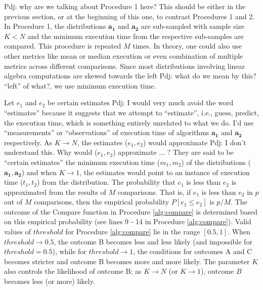 \documentclass[conference]{IEEEtran}
\newcommand{\p}[1]{{\color{blue} Pdj: #1}}
\begin{document}
\p{why are we talking about Procedure 1 here? This should be either in the previous section, or at the beginning of this
  one, to contrast Procedures 1 and 2.}
In Procedure 1, the distributions $\mathbf{a_1}$ and $\mathbf{a_2}$ are sub-sampled with sample size $K < N $ and the minimum
execution time from the respective sub-samples are compared. This procedure is repeated $M$ times. In theory, one could
also use other metrics like mean or median execution\cite{peise2019elaps} or even combination of multiple metrics across different
comparisons. Since most distributions involving linear algebra computations are skewed towards the left \p{what do we
  mean by this? ``left'' of what?}, we use minimum execution time\cite{peisethesis}\cite{robustbenchmarking}.

Let $e_1$ and $e_2$ be certain estimates \p{I would very much avoid the word ``estimates'' because it suggests that we
  attempt to ``estimate'', i.e., guess, predict, the execution time, which is something entirely unrelated to what we
  do. I'd use ``measurements'' or ``observations''}
of execution time of algorithms $\mathbf{a_1}$ and $\mathbf{a_2}$ respectively. As $K \to N$, the estimates ($e_1, e_2$)
would approximate \p{I don't understand this. Why would ($e_1, e_2$) approximate ... ? They are said to be ``certain
  estimates''}  the minimum execution time ($m_1, m_2$) of the distributions ($\mathbf{a_1}, \mathbf{a_2}$) and when $K \to 1$, the estimates would point to an instance of execution time ($t_1, t_2$) from the distribution.
The probability that $e_1$ is less than $e_2$ is approximated from the results of $M$ comparisons. That is, if $e_1$ is less than $e_2$ in $p$ out of $M$ comparisons, then the empirical probability $P[e_1 \le e_2]$ is $p/M$. 
%
The outcome of the Compare function in Procedure \ref{alg:compare} is determined based on this empirical probability (see lines 9 - 14 in Procedure \ref{alg:compare}).
Valid values of $threshold$ for Procedure \ref{alg:compare} lie in the range $[0.5,1]$. When $threshold \to 0.5$, the outcome B becomes
less and less likely (and impossible for $threshold=0.5$), while for $threshold \to 1$, the conditions for outcomes A
and C becomes stricter and outcome B becomes more and more likely. The parameter $K$ also controls the likelihood of outcome B; as $K \to N$ (or $K \to 1$), outcome $B$ becomes less (or more) likely. 
\end{document}
